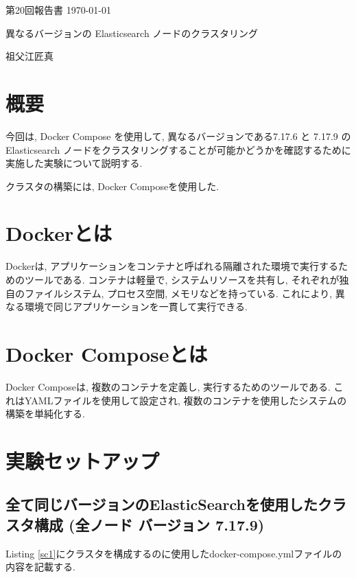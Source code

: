 \documentclass[a4j,12pt,]{jarticle}
\begin{document}
{\noindent\small 第20回報告書 \hfill\today}
\begin{center}
  {\Large 異なるバージョンの Elasticsearch ノードのクラスタリング}
\end{center}
\begin{flushright}
  祖父江匠真 \\
\end{flushright}

\section{概要}
今回は, Docker Compose を使用して, 異なるバージョンである7.17.6 と 7.17.9 の Elasticsearch ノードをクラスタリングすることが可能かどうかを確認するために実施した実験について説明する.

クラスタの構築には, Docker Composeを使用した.

\section{Dockerとは}
Dockerは, アプリケーションをコンテナと呼ばれる隔離された環境で実行するためのツールである. コンテナは軽量で, システムリソースを共有し, それぞれが独自のファイルシステム, プロセス空間, メモリなどを持っている. これにより, 異なる環境で同じアプリケーションを一貫して実行できる.

\section{Docker Composeとは}
Docker Composeは, 複数のコンテナを定義し, 実行するためのツールである. これはYAMLファイルを使用して設定され, 複数のコンテナを使用したシステムの構築を単純化する.

\section{実験セットアップ}
\subsection{全て同じバージョンのElasticSearchを使用したクラスタ構成 (全ノード バージョン 7.17.9)}

Listing \ref{sc1}にクラスタを構成するのに使用したdocker-compose.ymlファイルの内容を記載する.
\end{document}
